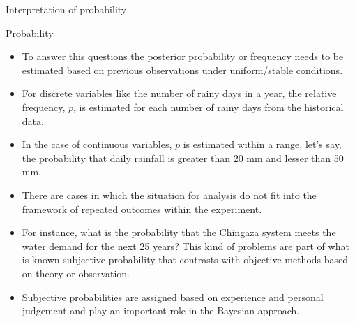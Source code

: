 \documentclass[8pt]{beamer}
\renewcommand{\emph}[1]{\textcolor{myorange}{#1}}
\begin{document}
\begin{frame}{Interpretation of probability}
    \begin{block}{Probability}
        \begin{itemize}
 
            \item To answer this questions the \emph{posterior probability} or \emph{frequency} needs to be estimated based on previous observations under uniform/stable conditions. 
            \item For discrete variables like the number of rainy days in a year, the \emph{relative frequency}, $p$, is  estimated for each number of rainy days from the historical data. 
            \item In the case of continuous variables, $p$ is estimated within a range, let's say, the probability that daily rainfall is greater than 20 mm and lesser than 50 mm. 
            \item There are cases in which the situation for analysis do not fit into the framework of repeated outcomes within the experiment. 
            \item For instance, what is the probability that the Chingaza system meets the water demand for the next 25 years?  This kind of problems are part of what is known \emph{subjective probability} that contrasts with objective methods based on theory or observation. 
            \item Subjective probabilities are assigned based on experience and personal judgement and play an important role in the \emph{Bayesian approach}. 
        \end{itemize}
    \end{block}
\end{frame}
\end{document}
